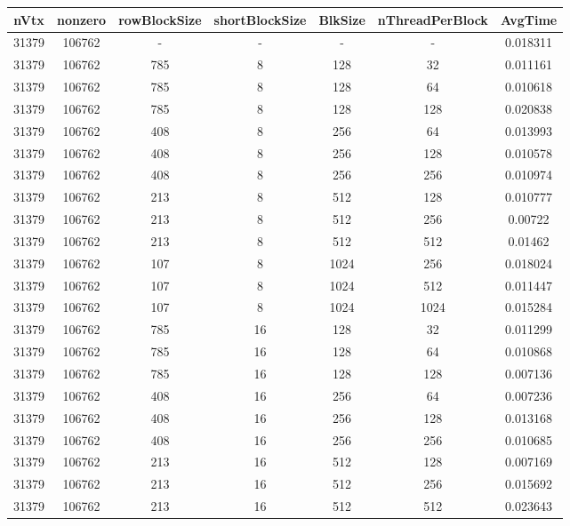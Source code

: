 \documentclass[9pt]{article}
\begin{document}
\SetBgPosition{0.25cm,-5.0cm}
\begin{tabular}{|c|c|c|c|c|c|c| }  
\hline
nVtx  & nonzero  & rowBlockSize  & shortBlockSize  & BlkSize  & nThreadPerBlock  & AvgTime \\
\hline
31379  & 106762  &  -  & -  & -  & -  &0.018311 \\
\hline
31379  & 106762  & 785  & 8  & 128  & 32  & 0.011161 \\
\hline
31379  & 106762  & 785  & 8  & 128  & 64  & 0.010618 \\
\hline
31379  & 106762  & 785  & 8  & 128  & 128  & 0.020838 \\
\hline
31379  & 106762  & 408  & 8  & 256  & 64  & 0.013993 \\
\hline
31379  & 106762  & 408  & 8  & 256  & 128  & 0.010578 \\
\hline
31379  & 106762  & 408  & 8  & 256  & 256  & 0.010974 \\
\hline
31379  & 106762  & 213  & 8  & 512  & 128  & 0.010777 \\
\hline
31379  & 106762  & 213  & 8  & 512  & 256  & 0.00722 \\
\hline
31379  & 106762  & 213  & 8  & 512  & 512  & 0.01462 \\
\hline
31379  & 106762  & 107  & 8  & 1024  & 256  & 0.018024 \\
\hline
31379  & 106762  & 107  & 8  & 1024  & 512  & 0.011447 \\
\hline
31379  & 106762  & 107  & 8  & 1024  & 1024  & 0.015284 \\
\hline
31379  & 106762  & 785  & 16  & 128  & 32  & 0.011299 \\
\hline
31379  & 106762  & 785  & 16  & 128  & 64  & 0.010868 \\
\hline
31379  & 106762  & 785  & 16  & 128  & 128  & 0.007136 \\
\hline
31379  & 106762  & 408  & 16  & 256  & 64  & 0.007236 \\
\hline
31379  & 106762  & 408  & 16  & 256  & 128  & 0.013168 \\
\hline
31379  & 106762  & 408  & 16  & 256  & 256  & 0.010685 \\
\hline
31379  & 106762  & 213  & 16  & 512  & 128  & 0.007169 \\
\hline
31379  & 106762  & 213  & 16  & 512  & 256  & 0.015692 \\
\hline
31379  & 106762  & 213  & 16  & 512  & 512  & 0.023643 \\

\end{tabular}
\end{document}
